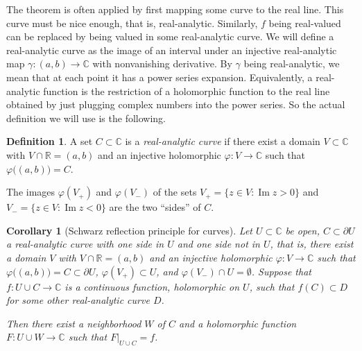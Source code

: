 \documentclass[12pt,openany]{book}
\renewcommand{\Im}{\operatorname{Im}}
\newcommand{\C}{{\mathbb{C}}}
\newcommand{\R}{{\mathbb{R}}}
\newcommand{\myquote}[1]{``#1''}
\theoremstyle{plain}
\newtheorem{cor}[thm]{Corollary}
\theoremstyle{remark}
\theoremstyle{definition}
\newtheorem{defn}[thm]{Definition}
\theoremstyle{exercise}
\theoremstyle{example}
\begin{document}
The theorem is often applied by first mapping some curve to the real line.
This curve must be nice enough, that is, real-analytic.  Similarly,
$f$ being real-valued can be replaced by being valued in some
real-analytic curve.
We will define a real-analytic curve as the image of
an interval under an injective
real-analytic map $\gamma \colon (a,b) \to \C$
with nonvanishing derivative.
By $\gamma$ being real-analytic, we mean that at each point it has a power
series expansion.  Equivalently, a real-analytic function is the
restriction of a holomorphic function to the real line obtained by just plugging
complex numbers into the power series.  So the actual definition we
will use is the following.

\begin{defn}
A set $C \subset \C$ is a \emph{real-analytic curve}
if there exist a domain $V \subset \C$ with
$V \cap \R = (a,b)$ and an injective holomorphic $\varphi \colon V \to \C$
such that $\varphi\bigl( (a,b) \bigr) = C$.
\end{defn}

The images $\varphi(V_+)$ and $\varphi(V_-)$ of the sets
$V_+ = \{ z \in V : \Im z > 0 \}$ and $V_- = \{ z \in V : \Im z < 0 \}$
are the two \myquote{sides} of $C$.

\begin{cor}[Schwarz reflection principle for curves]
Let $U \subset \C$ be open,
$C \subset \partial U$ a real-analytic curve with one side
in $U$ and one side not in $U$, that is, there exist a domain $V$ with
$V \cap \R = (a,b)$ and an injective holomorphic $\varphi \colon V \to \C$
such that $\varphi\bigl( (a,b) \bigr) = C \subset \partial U$,
$\varphi(V_+) \subset U$, and $\varphi(V_-) \cap U =
\emptyset$.  Suppose that $f \colon U \cup C \to \C$ is a continuous
function, holomorphic on $U$, such that $f(C) \subset D$ for some
other real-analytic curve $D$.

Then there exist a neighborhood $W$ of $C$ and a holomorphic
function $F \colon U \cup W \to \C$ such that $F|_{U \cup C} = f$.
\end{cor}
\end{document}

